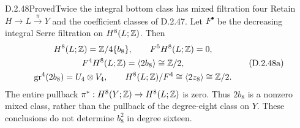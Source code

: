 \begin{claim}{D.2.48}{Proved}{Twice the integral bottom class has mixed filtration four}
Retain $H\to L\xrightarrow{\pi}Y$ and the coefficient classes
of D.2.47. Let $F^\bullet$ be the decreasing integral Serre
filtration on $H^8(L;\mathbb Z)$. Then
\[
\begin{gathered}
 H^8(L;\mathbb Z)=\mathbb Z/4\{b_8\},\qquad F^5H^8(L;\mathbb Z)=0,\\
 F^4H^8(L;\mathbb Z)=\langle2b_8\rangle\cong\mathbb Z/2,\\
 \operatorname{gr}^4(2b_8)=U_4\otimes V_4,
 \qquad H^8(L;\mathbb Z)/F^4\cong\langle2z_8\rangle\cong\mathbb Z/2.
\end{gathered}
\tag{D.2.48a}
\]
The entire pullback $\pi^*:H^8(Y;\mathbb Z)\to H^8(L;\mathbb Z)$
is zero. Thus $2b_8$ is a nonzero mixed class, rather than
the pullback of the degree-eight class on $Y$.
These conclusions do not determine $b_8^2$ in degree sixteen.
\end{claim}
